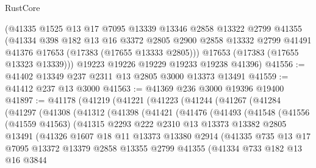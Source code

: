 \begin{lexlean}{RustCore}
\begin{coremodule}
      (@41335
        @1525
        @13
        @17
        @7095
        @13339
        @13346
        @2858
        @13322
        @2799
        @41355
        (@41334
          @398
          @182
          @13
          @16
          @3372
          @2805
          @2900
          @2858
          @13332
          @2799
          @41491
          @41376
          @17653
          (@17383 (@17655 @13333 @2805)))
        @17653
        (@17383 (@17655 @13323 @13339)))
      @19223
      @19226
      @19229
      @19233
      @19238
      @41396)
@41556 := @41402 @13349 @237 @2311 @13 @2805 @3000 @13373 @13491
@41559 := @41412 @237 @13 @3000
@41563 := @41369 @236 @3000 @19396 @19400
@41897 := @41178
    (@41219
      (@41221
        (@41223
          (@41244
            (@41267
              (@41284
                (@41297
                  (@41308
                    (@41312
                      (@41398
                        (@41421
                          (@41476
                            (@41493
                              (@41548
                                (@41556
                                  (@41559 @41563)
                                  (@41315
                                    @2293
                                    @222
                                    @2310
                                    @13
                                    @13373
                                    @13382
                                    @2805
                                    @13491
                                    (@41326
                                      @1607
                                      @18
                                      @11
                                      @13373
                                      @13380
                                      @2914
                                      (@41335
                                        @735
                                        @13
                                        @17
                                        @7095
                                        @13372
                                        @13379
                                        @2858
                                        @13355
                                        @2799
                                        @41355
                                        (@41334
                                          @733
                                          @182
                                          @13
                                          @16
                                          @3844

\end{coremodule}
\end{lexlean}

